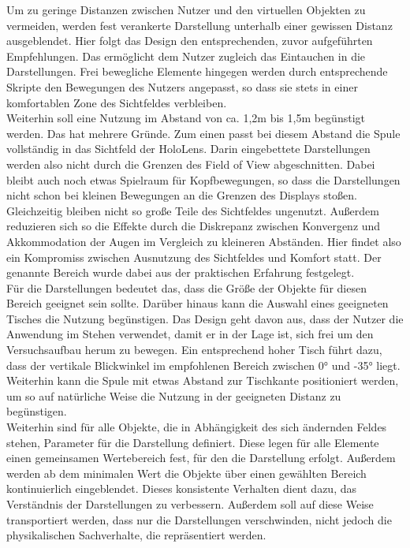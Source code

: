 Um zu geringe Distanzen zwischen Nutzer und den virtuellen Objekten zu vermeiden, werden fest verankerte Darstellung unterhalb einer gewissen Distanz ausgeblendet. Hier folgt das Design den entsprechenden, zuvor aufgeführten Empfehlungen. Das ermöglicht dem Nutzer zugleich das Eintauchen in die Darstellungen. Frei bewegliche Elemente hingegen werden durch entsprechende Skripte den Bewegungen des Nutzers angepasst, so dass sie stets in einer komfortablen Zone des Sichtfeldes verbleiben.\\

Weiterhin soll eine Nutzung im Abstand von ca. 1,2m bis 1,5m begünstigt werden. Das hat mehrere Gründe. Zum einen passt bei diesem Abstand die Spule vollständig in das Sichtfeld der HoloLens. Darin eingebettete Darstellungen werden also nicht durch die Grenzen des Field of View abgeschnitten. Dabei bleibt auch noch etwas Spielraum für Kopfbewegungen, so dass die Darstellungen nicht schon bei kleinen Bewegungen an die Grenzen des Displays stoßen. Gleichzeitig bleiben nicht so große Teile des Sichtfeldes ungenutzt. Außerdem reduzieren sich so die Effekte durch die Diskrepanz zwischen Konvergenz und Akkommodation der Augen im Vergleich zu kleineren Abständen. Hier findet also ein Kompromiss zwischen Ausnutzung des Sichtfeldes und Komfort statt. Der genannte Bereich wurde dabei aus der praktischen Erfahrung festgelegt.\\

Für die Darstellungen bedeutet das, dass die Größe der Objekte für diesen Bereich geeignet sein sollte. Darüber hinaus kann die Auswahl eines geeigneten Tisches die Nutzung begünstigen. Das Design geht davon aus, dass der Nutzer die Anwendung im Stehen verwendet, damit er in der Lage ist, sich frei um den Versuchsaufbau herum zu bewegen. Ein entsprechend hoher Tisch führt dazu, dass der vertikale Blickwinkel im empfohlenen Bereich zwischen 0° und -35° liegt. Weiterhin kann die Spule mit etwas Abstand zur Tischkante positioniert werden, um so auf natürliche Weise die Nutzung in der geeigneten Distanz zu begünstigen.\\

Weiterhin sind für alle Objekte, die in Abhängigkeit des sich ändernden Feldes stehen, Parameter für die Darstellung definiert. Diese legen für alle Elemente einen gemeinsamen Wertebereich fest, für den die Darstellung erfolgt. Außerdem werden ab dem minimalen Wert die Objekte über einen gewählten Bereich kontinuierlich eingeblendet. Dieses konsistente Verhalten dient dazu, das Verständnis der Darstellungen zu verbessern. Außerdem soll auf diese Weise transportiert werden, dass nur die Darstellungen verschwinden, nicht jedoch die physikalischen Sachverhalte, die repräsentiert werden.\\

